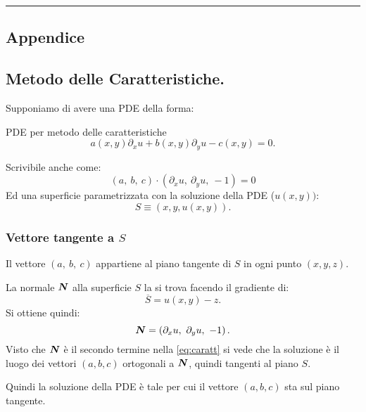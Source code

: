 \noindent\rule{0.48\textwidth}{0.7pt}
\newpage
\addtocounter{Sec}{\value{section}}%
\begin{appendices}
\section*{Appendice}%
\setcounter{section}{\theSec}%
\setcounter{subsection}{0}%
\renewcommand{\thesubsection}{\arabic{section}.\Alph{subsection}}

\subsection{Metodo delle Caratteristiche.}
\label{sub:caratteristiche}
Supponiamo di avere una PDE della forma:
\begin{redbox}{PDE per metodo delle caratteristiche}
\[
    a(x,y) \partial_{x}u + b(x,y) \partial_{y}u - c(x, y) = 0
.\] 
\end{redbox}
\noindent
Scrivibile anche come:
\begin{equation}
    \left(a,\ b,\ c\right)\cdot \left(\partial_{x}u,\ \partial_{y}u,\ -1\right) = 0
    \label{eq:caratt}
\end{equation}
Ed una superficie parametrizzata con la soluzione della PDE ($u(x,y))$: 
\[
    S \equiv (x,y, u(x,y) ) 
.\] 

\noindent
\subsubsection{Vettore tangente a $S$}%
\label{subsub:Vettore tangente a S}
\begin{bluebox}{}
Il vettore $\left(a, \ b, \ c\right)$ appartiene al piano tangente di $S$ in ogni punto $\left(x, y, z\right)$.
\end{bluebox}
\noindent
La normale $\boldsymbol{N}$ alla superficie $S$ la si trova facendo il gradiente di:
\[
    \overline{S} = u(x,y) - z
.\] 
Si ottiene quindi:
\[
    \boldsymbol{N}  = \left(\partial_{x}u, \ \partial_{y}u, \ -1\right)
.\] 
Visto che $\boldsymbol{N}$ è il secondo termine nella \ref{eq:caratt} si vede che la soluzione è il luogo dei vettori $(a, b,c)$ ortogonali a $\boldsymbol{N}$, quindi tangenti al piano $S$.

\noindent
Quindi la soluzione della PDE è tale per cui il vettore $(a,b,c)$ sta sul piano tangente.


\end{appendices}
